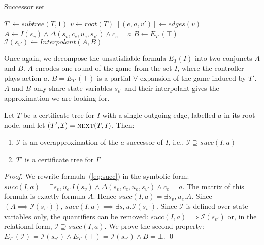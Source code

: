 \begin{algorithm}[t]
   \caption{Successor set}\label{alg:next}
   \begin{algorithmic}[1]
            \State $T' \gets subtree(T, 1)$
            \State $v \gets root(T)$
            \State $[(e,a,v')] \gets edges(v)$
            \State $A \gets I(s_v) \land  \Delta(s_v, c_e, u_e, s_{v'}) \land c_e = a$\label{alg:strat:partition:Ai}
            \State $B \gets E_{T'}(\top)$\label{alg:strat:partition:Bi}
            \State $\mathcal{I}(s_{v'}) \gets Interpolant(A, B)$\label{alg:strat:partition:I}
            \State {} \label{alg:strat:partition:return}
        \EndFunction
    \end{algorithmic}
\end{algorithm}

Once again, we decompose the unsatisfiable formula $E_T(I)$ into
two conjuncts $A$ and $B$.  $A$ encodes one round of the game
from the set $I$, where the controller plays action $a$.
$B = E_{T'}(\top)$ is a partial $\forall$-expansion of the game induced by $T'$.
$A$ and $B$ only share state variables $s_{v'}$ and their interpolant
gives the approximation we are looking for.

\begin{proposition}\label{prop:next}
    Let $T$ be a certificate tree for $I$ with a single outgoing
    edge, labelled $a$ in its root node, and let $(T',\mathcal{I})
    = \textsc{next}(T,I)$.
    Then:
    \begin{enumerate}
        \item $\mathcal{I}$ is an overapproximation of the
            $a$-successor of $I$, i.e., $\mathcal{I} \supseteq
            succ(I, a)$
        \item $T'$ is a certificate tree for $I'$
    \end{enumerate}
\end{proposition}
\begin{proof}
We rewrite formula~(\ref{eq:succ}) in the symbolic form:
$succ(I, a) = \exists s_v,u_e. I(s_v) \land
\Delta(s_v,c_e,u_e,s_{v'}) \land c_e = a$.  The matrix of
this formula is exactly formula $A$.  Hence $succ(I,a) =
\exists s_v,u_e. A$.  Since $(A\implies
\mathcal{I}(s_{v'}))$, $succ(I,a) \implies \exists s,u.
\mathcal{I}(s_{v'})$.  Since $\mathcal{I}$ is defined over
state variables only, the quantifiers can be removed:
$succ(I,a) \implies \mathcal{I}(s_{v'})$ or, in the
relational form, $\mathcal{I} \supseteq succ(I, a)$.
We prove the second property:
$E_{T'}(\mathcal{I}) = \mathcal{I}(s_{v'}) \land
E_{T'}(\top) = \mathcal{I}(s_{v'}) \land B = \bot$.
    \qed
\end{proof}

